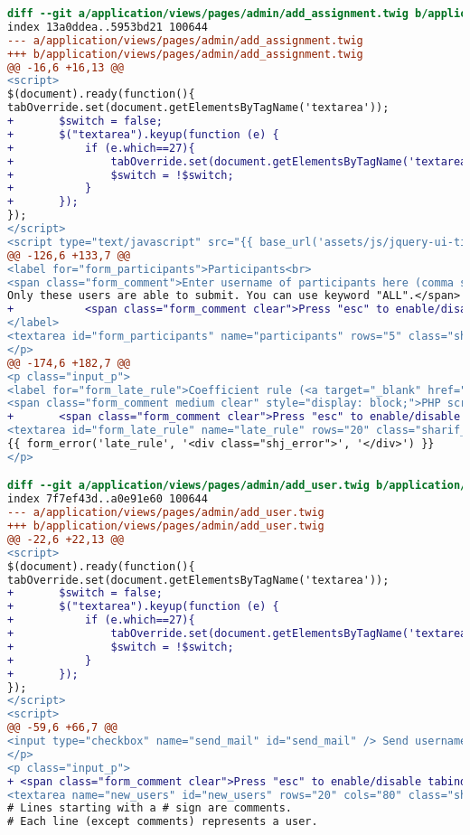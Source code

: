 \begin{lstlisting}[language=diff, caption=Perubahan untuk mematuhi kriteria 2.1.2, label=lst_2.1.2, basicstyle=\ttfamily, frame=single,
columns=fullflexible, keepspaces=true, breaklines=true]
diff --git a/application/views/pages/admin/add_assignment.twig b/application/views/pages/admin/add_assignment.twig
index 13a0ddea..5953bd21 100644
--- a/application/views/pages/admin/add_assignment.twig
+++ b/application/views/pages/admin/add_assignment.twig
@@ -16,6 +16,13 @@
<script>
$(document).ready(function(){
tabOverride.set(document.getElementsByTagName('textarea'));
+ 		$switch = false;
+ 		$("textarea").keyup(function (e) {
+ 			if (e.which==27){
+ 				tabOverride.set(document.getElementsByTagName('textarea'),$switch);
+  				$switch = !$switch;
+      		}
+ 	 	});
});
</script>
<script type="text/javascript" src="{{ base_url('assets/js/jquery-ui-timepicker-addon.js') }}"></script>
@@ -126,6 +133,7 @@
<label for="form_participants">Participants<br>
<span class="form_comment">Enter username of participants here (comma separated).
Only these users are able to submit. You can use keyword "ALL".</span>
+ 			<span class="form_comment clear">Press "esc" to enable/disable tabindent</span>
</label>
<textarea id="form_participants" name="participants" rows="5" class="sharif_input medium">{{ edit ? edit_assignment.participants : set_value('participants', 'ALL') }}</textarea>
</p>
@@ -174,6 +182,7 @@
<p class="input_p">
<label for="form_late_rule">Coefficient rule (<a target="_blank" href="https://github.com/ifunpar/Sharif-Judge/blob/docs/v1.4/add_assignment.md#coefficient-rule">?</a>)</label><br>
<span class="form_comment medium clear" style="display: block;">PHP script without &lt;?php ?&gt; tags</span>
+ 		<span class="form_comment clear">Press "esc" to enable/disable tabindent</span><br>
<textarea id="form_late_rule" name="late_rule" rows="20" class="sharif_input add_text">{{ edit ? edit_assignment.late_rule : set_value('late_rule', default_late_rule) }}</textarea>
{{ form_error('late_rule', '<div class="shj_error">', '</div>') }}
</p>

diff --git a/application/views/pages/admin/add_user.twig b/application/views/pages/admin/add_user.twig
index 7f7ef43d..a0e91e60 100644
--- a/application/views/pages/admin/add_user.twig
+++ b/application/views/pages/admin/add_user.twig
@@ -22,6 +22,13 @@
<script>
$(document).ready(function(){
tabOverride.set(document.getElementsByTagName('textarea'));
+ 		$switch = false;
+ 		$("textarea").keyup(function (e) {
+ 			if (e.which==27){
+ 				tabOverride.set(document.getElementsByTagName('textarea'),$switch);
+ 				$switch = !$switch;
+      		}
+ 		});
});
</script>
<script>
@@ -59,6 +66,7 @@
<input type="checkbox" name="send_mail" id="send_mail" /> Send usernames and passwords by email (Waits <input type="text" name="delay" id="delay" class="sharif_input tiny" value="2"/> second(s) before sending each email, so please be patient).
</p>
<p class="input_p">
+ <span class="form_comment clear">Press "esc" to enable/disable tabindent</span><br>
<textarea name="new_users" id="new_users" rows="20" cols="80" class="sharif_input">
# Lines starting with a # sign are comments.
# Each line (except comments) represents a user.


\end{lstlisting}
